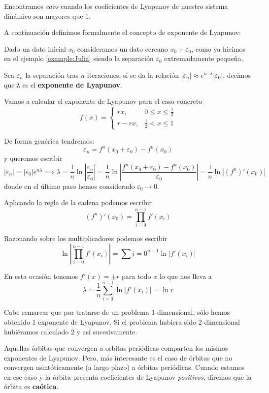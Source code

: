 Encontramos \emph{caos} cuando los coeficientes de Lyapunov de nuestro sistema dinámico son mayores que 1.

A continuación definimos formalmente el concepto de exponente  de Lyapunov:

\begin{definition}
Dado un dato inicial $x_0$ consideramos un dato cercano $x_0+ε_0$, como ya hicimos en el ejemplo \ref{example:Julia} siendo la separación $ε_0$ extremadamente pequeña.

Sea $ε_n$ la separación tras $n$ iteraciones, si se da la relación $|ε_n|\approx e^{n\cdot λ}|ε_0|$, decimos que λ es el \textbf{exponente de Lyapunov}.
\end{definition}

\begin{example}
Vamos a calcular el exponente de Lyapunov para el caso concreto
\[f(x) = \left\{ \begin{array}{ll}
rx, & 0 \leq x \leq \frac{1}{2}\\
r-rx, & \frac{1}{2} < x \leq 1
\end{array}\right.\]

De forma genérica tendremos:
\[ε_n = f^n(x_0+ε_0)-f^n(x_0) \]
y queremos escribir
\[|ε_n| = |ε_0| e^{nλ} \implies λ = \frac{1}{n} \ln\left| \frac{ε_n}{ε_0}\right| = \frac{1}{n}\ln \left|\frac{f^n(x_0+ε_0)-f^n(x_0)}{ε_0} \right| = \frac{1}{n}\ln \left|(f^n)'(x_0) \right|\]
donde en el último paso hemos considerado $ε_0 \to 0$.

Aplicando la regla de la cadena podemos escribir
\[(f^n)'(x_0) = \prod_{i=0}^{n-1}f'(x_i) \]

Razonando sobre los multiplicadores podemos escribir
\[\ln \left|\prod_{i=0}^{n-1}f'(x_i)\right| = \sum{i=0}^{n-1}\ln |f'(x_i)| \]

En esta ocasión tenemos $f'(x)=\pm r$ para todo $x$ lo que nos lleva a
\[λ= \frac{1}{n}\sum_{i=0}^{n-1}\ln |f'(x_i)| = \ln r\]
\end{example}

Cabe remarcar que por tratarse de un problema 1-dimensional, sólo hemos obtenido 1 exponente de Lyapunov. Si el problema hubiera sido 2-dimensional hubiéramos calculado 2 y así sucesivamente.

Aquellas órbitas que convergen a orbitas periódicas comparten los mismos exponentes de Lyapunov. Pero, más interesante es el caso de órbitas que no convergen asintóticamente (a largo plazo) a órbitas periódicas. Cuando estamos en ese caso y la órbita presenta coeficientes de Lyapunov \emph{positivos}, diremos que la órbita es \textbf{caótica}.

